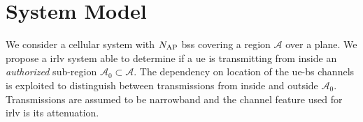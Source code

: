 \documentclass[conference,draftcls,onecolumn]{IEEEtran}
\begin{document}

 
\section{System Model}\label{sec:sys model}


We consider a cellular system with $N_{\rm AP}$ \acp{bs} covering a region $\mathcal{A}$ over a plane. We propose a \ac{irlv} system able to determine if a \ac{ue} is transmitting from inside an {\em authorized} sub-region $\mathcal{A}_0 \subset \mathcal{A}$. The dependency on location of the \ac{ue}-\ac{bs} channels is exploited to distinguish between transmissions from inside and outside $\mathcal{A}_0$. Transmissions are assumed to be narrowband and the channel feature used for \ac{irlv} is its attenuation.
\end{document}

